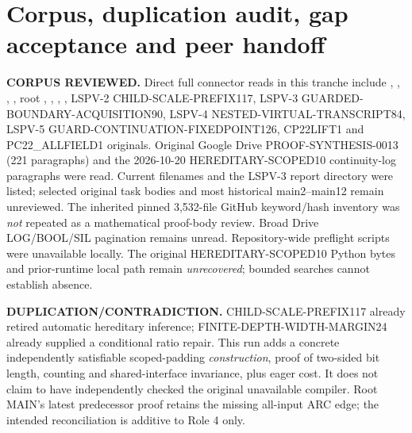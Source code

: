 \documentclass[11pt]{article}
\begin{document}
\section{Corpus, duplication audit, gap acceptance and peer handoff}
\noindent\textbf{CORPUS REVIEWED.}
Direct full connector reads in this tranche include
, ,
,
, root ,
,
,
,
LSPV-2 CHILD-SCALE-PREFIX117, LSPV-3
GUARDED-BOUNDARY-ACQUISITION90, LSPV-4
NESTED-VIRTUAL-TRANSCRIPT84, LSPV-5
GUARD-CONTINUATION-FIXEDPOINT126,
CP22LIFT1 and PC22_ALLFIELD1 originals.
Original Google Drive
PROOF-SYNTHESIS-0013 (221 paragraphs)
and the 2026-10-20 HEREDITARY-SCOPED10
continuity-log paragraphs were read.
Current  filenames and the LSPV-3
report directory were listed; selected original
task bodies and most historical main2--main12
remain unreviewed. The inherited pinned
3,532-file GitHub keyword/hash inventory
was \emph{not} repeated as a mathematical
proof-body review. Broad Drive LOG/BOOL/SIL
pagination remains unread. Repository-wide
preflight scripts were unavailable locally.
The original HEREDITARY-SCOPED10 Python bytes
and prior-runtime local path remain \emph{unrecovered};
bounded searches cannot establish absence.

\noindent\textbf{DUPLICATION/CONTRADICTION.}
CHILD-SCALE-PREFIX117 already retired
automatic hereditary inference; FINITE-DEPTH-WIDTH-MARGIN24
already supplied a conditional ratio repair.
This run adds a concrete independently
satisfiable scoped-padding \emph{construction},
proof of two-sided bit length, counting and
shared-interface invariance, plus eager cost.
It does not claim to have independently
checked the original unavailable compiler.
Root MAIN's latest predecessor proof retains
the missing all-input ARC edge; the intended
reconciliation is additive to Role 4 only.
\end{document}
